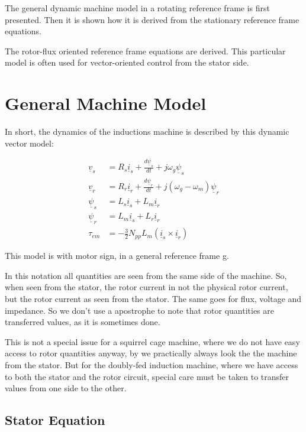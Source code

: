 \documentclass[]{book}
\begin{document}
The general dynamic machine model in a rotating reference frame is first presented. Then it is shown how it is derived from the stationary reference frame equations.

The rotor-flux oriented reference frame equations are derived. This particular model is often used for vector-oriented control from the stator side.

\hypertarget{general-machine-model}{%
\section{General Machine Model}\label{general-machine-model}}

In short, the dynamics of the inductions machine is described by this dynamic vector model:

\[
\begin{aligned}
\underline{v}_s & = R_s \underline{i}_s + \frac{d\underline{\psi}_s}{dt} + j \omega_g \underline{\psi}_s  \\
\underline{v}_r & = R_r \underline{i}_r + \frac{d\underline{\psi}_r}{dt} + j (\omega_g-\omega_m) \underline{\psi}_r \\
\underline{\psi}_s & = L_s \underline{i}_s + L_m \underline{i}_r\\
\underline{\psi}_r & = L_m \underline{i}_s + L_r \underline{i}_r\\
\tau_{em} &= - \frac{3}{2}N_{pp}L_m(\underline{i}_s  \times \underline{i}_r)
\end{aligned}
\label{eq:genDqMdl}
\]

This model is with motor sign, in a general reference frame g.

In this notation all quantities are seen from the same side of the machine. So, when seen from the stator, the rotor current in not the physical rotor current, but the rotor current as seen from the stator. The same goes for flux, voltage and impedance. So we don't use a apostrophe to note that rotor quantities are transferred values, as it is sometimes done.

This is not a special issue for a squirrel cage machine, where we do not have easy access to rotor quantities anyway, by we practically always look the the machine from the stator. But for the doubly-fed induction machine, where we have access to both the stator and the rotor circuit, special care must be taken to transfer values from one side to the other.

\hypertarget{stator-equation}{%
\subsection{Stator Equation}\label{stator-equation}}
\end{document}

